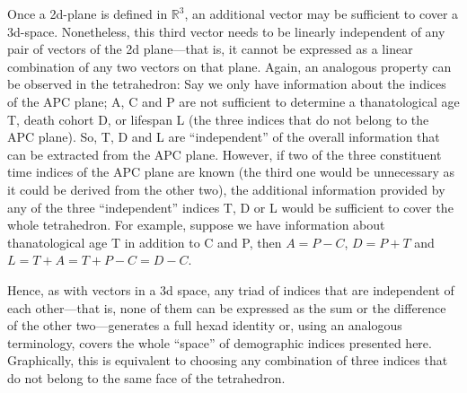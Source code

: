 \documentclass[12pt,oneside,a4paper]{article} %
\begin{document}

Once a 2d-plane is defined in $\mathbb{R}^3$, an additional vector may be sufficient to cover a
3d-space. Nonetheless, this third vector needs to be linearly independent
of any pair of vectors of the 2d plane---that is, it cannot be expressed as a
linear combination of any two vectors on that plane. Again, an analogous
property can be observed in the tetrahedron: Say we only have information about
the indices of the APC plane; A, C and P are not sufficient to determine a thanatological age T, death cohort D, or lifespan L (the three indices that do not belong to the APC plane). So, T, D and L are ``independent'' of the overall information that can be extracted from the APC plane. However, if two of the three constituent time indices of the APC plane are known (the third one would be unnecessary as it could be derived from the other two), the additional information provided by any of the three ``independent'' indices T, D or L would be sufficient to cover the whole tetrahedron. For example, suppose we have information about thanatological age T in addition to C and P, then $A=P-C$, $D=P+T$ and $L=T+A=T+P-C=D-C$. 

Hence, as with vectors in a 3d space, any
triad of indices that are independent of each other---that is, none of them can
be expressed as the sum or the difference of the other two---generates a full
hexad identity or, using an analogous terminology, covers the whole ``space'' of
demographic indices presented here. Graphically, this is equivalent to
choosing any combination of three indices that do not belong to the same face
of the tetrahedron.%

\end{document}
